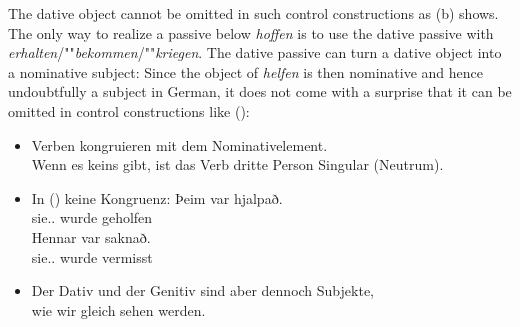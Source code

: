 \eal
{}
\zl
The dative object cannot be omitted in such control constructions as (b) shows. The only way
to realize a passive below \emph{hoffen} is to use the dative passive with
\emph{erhalten}/""\emph{bekommen}/""\emph{kriegen}. The dative passive can turn a dative object into a
nominative subject:
\z
Since the object of \emph{helfen} is then nominative and hence undoubtfully a subject in German, it
does not come with a surprise that it can be omitted in control constructions like ():
\z






\begin{itemize}
\item Verben kongruieren mit dem Nominativelement.\\
      Wenn es keins gibt, ist das Verb dritte Person Singular (Neutrum).


\item In () keine Kongruenz:
\eal
\ex 
\gll Þeim       var hjalpað.\\
     sie.\emph{\PL}.\DAT{} wurde geholfen\\
\ex 
\gll Hennar var saknað.\\
     sie.\emph{\SG}.\GEN{} wurde vermisst\\
\zl


\item Der Dativ und der Genitiv sind aber dennoch Subjekte,\\
      wie wir gleich sehen werden.

\end{itemize}

\fi

